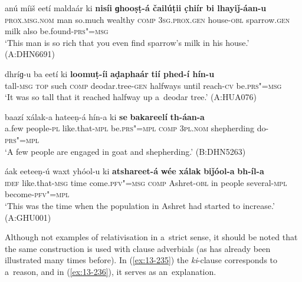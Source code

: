 \begin{exe}
\ex
\label{ex:13-231}
\gll anú míiš eetí maldaár ki \textbf{nisíi} \textbf{ ɡhooṣṭ-á čailúṭii c̣hiír bi lhayiǰ-áan-u} \\
\textsc{prox.msg.nom} man so.much wealthy \textsc{comp} \textsc{3sg.prox.gen }  house-\textsc{obl} sparrow.\textsc{gen} milk also be.found-\textsc{prs"=msg} \\
\glt `This man is so rich that you even find sparrow's milk in his house.' (A:DHN6691)

\ex
\label{ex:13-232}
\gll dhríɡ-u ba eetí ki \textbf{loomuṭ-íi} \textbf{aḍaphaár} \textbf{ tií phed-í hín-u} \\
tall-\textsc{msg} \textsc{top} such \textsc{comp} deodar.tree-\textsc{gen} halfways until reach-\textsc{cv} be.\textsc{prs"=msg}\\
\glt `It was so tall that it reached halfway up a~deodar tree.' (A:HUA076)

\ex
\label{ex:13-233}
\gll baazí xálak-a hateeṇ-á hín-a ki  \textbf{se} \textbf{bakareelí} \textbf{th-áan-a}  \\
a.few people-\textsc{pl}  like.that-\textsc{mpl} be.\textsc{prs"=mpl} \textsc{comp}  \textsc{3pl.nom}  shepherding do-\textsc{prs"=mpl} \\
\glt `A few people are engaged in goat and shepherding.' (B:DHN5263)

\ex
\label{ex:13-234}
\gll áak eeteeṇ-ú waxt yhóol-u ki  \textbf{atshareet-á} \textbf{wée} \textbf{xálak} \textbf{biǰóol-a} \textbf{bh-íl-a} \\
\textsc{idef} like.that-\textsc{msg} time come.\textsc{pfv"=msg} \textsc{comp} Ashret-\textsc{obl} in people several-\textsc{mpl} become-\textsc{pfv"=mpl} \\
\glt `This was the time when the population in Ashret had started to increase.' (A:GHU001) 
\end{exe}

Although not examples of relativisation in a~strict sense, it should be noted that the same construction is used with clause adverbials (as has already been illustrated many times before). In (\ref{ex:13-235}) the \textit{ki}-clause corresponds to a~reason, and in (\ref{ex:13-236}), it serves as an~explanation.

